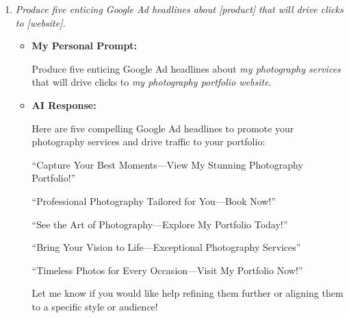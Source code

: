 \documentclass[12pt]{article}
\begin{document}
\begin{enumerate}
\begin{itemize}
---

### 9. **Why Dogs Love Our Sweaters**  
   **Concept:** Highlight benefits from a dog’s \"perspective.\"  
   **Script:** Add playful text like, \"Keeps me warm. Gets me compliments. 10/10.\" Pair with cute clips of dogs enjoying their sweaters.  
   **Caption:** *\"Your pup deserves the best! ����\"*  
   **Audio:** A lighthearted or funny sound effect.

---

### 10. **Sweater Giveaway or Challenge**  
   **Concept:** Encourage user participation.  
   **Script:** Announce a contest where viewers can win a sweater for their dog by posting their cutest pet photo or video.  
   **Caption:** *\"Want your pup to rock one of these? Enter our giveaway! ����\"*  
   **Audio:** Exciting or celebratory music.

---

Would you like a script or storyboard for any of these ideas?
        
    \end{itemize}

    \item \emph{Produce five enticing Google Ad headlines about [product] that will drive clicks to [website].}

    \begin{itemize}
        \item \textbf{My Personal Prompt:}

        Produce five enticing Google Ad headlines about \emph{my photography services} that will drive clicks to \emph{my photography portfolio website}.
        
        \item \textbf{AI Response:}

        Here are five compelling Google Ad headlines to promote your photography services and drive traffic to your portfolio:

        “Capture Your Best Moments—View My Stunning Photography Portfolio!”
        
        “Professional Photography Tailored for You—Book Now!”
        
        “See the Art of Photography—Explore My Portfolio Today!”
        
        “Bring Your Vision to Life—Exceptional Photography Services”
        
        “Timeless Photos for Every Occasion—Visit My Portfolio Now!”

        Let me know if you would like help refining them further or aligning them to a specific style or audience!
        
    \end{itemize}
    
\end{enumerate}
\end{document}
